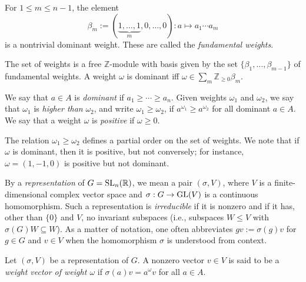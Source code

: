 \documentclass[reqno]{amsart} 
\begin{document}
\begin{example}
  For $1 \leq m \leq n-1$, the element
  \begin{equation*}
    \beta_m := (\underbrace{1,\dotsc,1}_{m},0,\dotsc,0) : a \mapsto a_1 \dotsb a_m
  \end{equation*}
  is a nontrivial dominant weight.  These are called the \emph{fundamental weights}.
\end{example}

\begin{exercise}
  The set of weights is a free $\mathbb{Z}$-module with basis given by the set $\{\beta_1, \dotsc, \beta_{m-1}\}$ of fundamental weights.  A weight $\omega$ is dominant iff $\omega \in \sum_{m} \mathbb{Z}_{\geq 0} \beta_m$.
\end{exercise}

\begin{definition}
  We say that $a \in A$ is \emph{dominant} if $a_1 \geq \dotsb \geq a_n$.  Given weights $\omega_1$ and $\omega_2$, we say that $\omega_1$ is \emph{higher than} $\omega_2$, and write $\omega_1 \geq \omega_2$, if $a^{\omega_1} \geq a^{\omega_2}$ for all dominant $a \in A$.  We say that a weight $\omega$ is \emph{positive} if $\omega \geq 0$.
\end{definition}
The relation $\omega_1 \geq \omega_2$ defines a partial order on the set of weights.  We note that if $\omega$ is dominant, then it is positive, but not conversely; for instance, $\omega = (1,-1,0)$ is positive but not dominant.

\begin{definition}
  By a \emph{representation} of $G = \operatorname{SL}_n(\mathbb{R})$, we mean a pair $(\sigma,V)$, where $V$ is a finite-dimensional complex vector space and $\sigma : G \rightarrow \operatorname{GL}(V)$ is a continuous homomorphism.  Such a representation is \emph{irreducible} if it is nonzero and if it has, other than $\{0\}$ and $V$, no invariant subspaces (i.e., subspaces $W \leq V$ with $\sigma(G) W \subseteq W$).  As a matter of notation, one often abbreviates $g v := \sigma(g) v$ for $g \in G$ and $v \in V$ when the homomorphism $\sigma$ is understood from context.
\end{definition}

\begin{definition}
  Let $(\sigma,V)$ be a representation of $G$.  A nonzero vector $v \in V$ is said to be a \emph{weight vector of weight $\omega$} if $\sigma(a) v = a^{\omega} v$ for all $a \in A$.
\end{definition}
\end{document}
